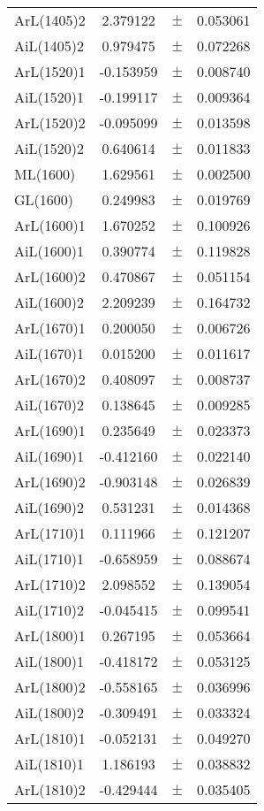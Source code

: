 \begin{table}
\begin{tiny}
\begin{tabular}{lccc}
ArL(1405)2 & 2.379122 & $\pm$ & 0.053061 \\
AiL(1405)2 & 0.979475 & $\pm$ & 0.072268 \\
ArL(1520)1 & -0.153959 & $\pm$ & 0.008740 \\
AiL(1520)1 & -0.199117 & $\pm$ & 0.009364 \\
ArL(1520)2 & -0.095099 & $\pm$ & 0.013598 \\
AiL(1520)2 & 0.640614 & $\pm$ & 0.011833 \\
ML(1600) & 1.629561 & $\pm$ & 0.002500 \\
GL(1600) & 0.249983 & $\pm$ & 0.019769 \\
ArL(1600)1 & 1.670252 & $\pm$ & 0.100926 \\
AiL(1600)1 & 0.390774 & $\pm$ & 0.119828 \\
ArL(1600)2 & 0.470867 & $\pm$ & 0.051154 \\
AiL(1600)2 & 2.209239 & $\pm$ & 0.164732 \\
ArL(1670)1 & 0.200050 & $\pm$ & 0.006726 \\
AiL(1670)1 & 0.015200 & $\pm$ & 0.011617 \\
ArL(1670)2 & 0.408097 & $\pm$ & 0.008737 \\
AiL(1670)2 & 0.138645 & $\pm$ & 0.009285 \\
ArL(1690)1 & 0.235649 & $\pm$ & 0.023373 \\
AiL(1690)1 & -0.412160 & $\pm$ & 0.022140 \\
ArL(1690)2 & -0.903148 & $\pm$ & 0.026839 \\
AiL(1690)2 & 0.531231 & $\pm$ & 0.014368 \\
ArL(1710)1 & 0.111966 & $\pm$ & 0.121207 \\
AiL(1710)1 & -0.658959 & $\pm$ & 0.088674 \\
ArL(1710)2 & 2.098552 & $\pm$ & 0.139054 \\
AiL(1710)2 & -0.045415 & $\pm$ & 0.099541 \\
ArL(1800)1 & 0.267195 & $\pm$ & 0.053664 \\
AiL(1800)1 & -0.418172 & $\pm$ & 0.053125 \\
ArL(1800)2 & -0.558165 & $\pm$ & 0.036996 \\
AiL(1800)2 & -0.309491 & $\pm$ & 0.033324 \\
ArL(1810)1 & -0.052131 & $\pm$ & 0.049270 \\
AiL(1810)1 & 1.186193 & $\pm$ & 0.038832 \\
ArL(1810)2 & -0.429444 & $\pm$ & 0.035405 \\

\end{tabular}
\end{tiny}
\end{table}
